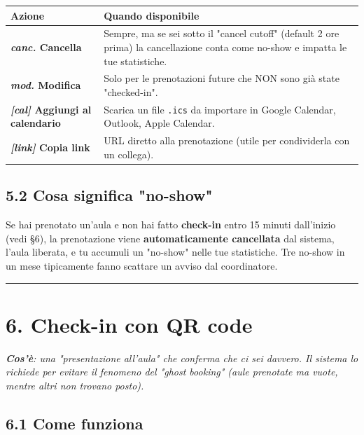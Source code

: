 \documentclass[11pt,a4paper]{article}
\renewenvironment{quote}
  {\begin{list}{}{%
      \setlength{\leftmargin}{8pt}%
      \setlength{\rightmargin}{8pt}%
      \setlength{\topsep}{6pt}%
      \setlength{\parsep}{0pt}}%
      \item\relax\color{black!75}\itshape}
  {\end{list}}
\begin{document}
\begin{table}[H]
\centering
\small
\begin{tabularx}{\linewidth}{|X|X|}
\hline
\rowcolor{tableheader} Azione & Quando disponibile \\
\hline
\textbf{\textit{canc.} Cancella} & Sempre, ma se sei sotto il "cancel cutoff" (default 2 ore prima) la cancellazione conta come no-show e impatta le tue statistiche. \\
\hline
\textbf{\textit{mod.} Modifica} & Solo per le prenotazioni future che NON sono già state "checked-in". \\
\hline
\textbf{\textit{[cal]} Aggiungi al calendario} & Scarica un file \texttt{.ics} da importare in Google Calendar, Outlook, Apple Calendar. \\
\hline
\textbf{\textit{[link]} Copia link} & URL diretto alla prenotazione (utile per condividerla con un collega). \\
\hline
\end{tabularx}
\end{table}


\subsection{5.2 Cosa significa "no-show"}


Se hai prenotato un'aula e non hai fatto \textbf{check-in} entro 15 minuti dall'inizio (vedi §6), la prenotazione viene \textbf{automaticamente cancellata} dal sistema, l'aula liberata, e tu accumuli un "no-show" nelle tue statistiche. Tre no-show in un mese tipicamente fanno scattare un avviso dal coordinatore.

\medskip\hrule\medskip

\section{6. Check-in con QR code}


\begin{quote}
\textbf{Cos'è}: una "presentazione all'aula" che conferma che ci sei davvero. Il sistema lo richiede per evitare il fenomeno del "ghost booking" (aule prenotate ma vuote, mentre altri non trovano posto).
\end{quote}

\subsection{6.1 Come funziona}
\end{document}
